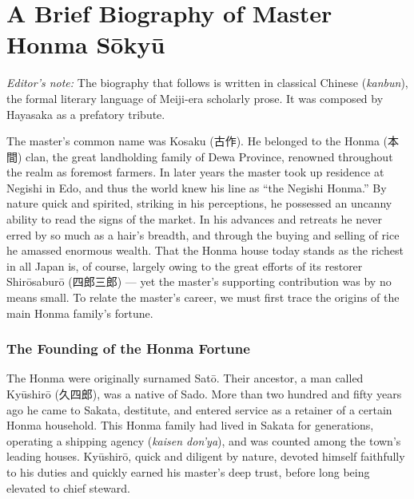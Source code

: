 \documentclass[10pt, openany]{book}
\newcommand{\jp}[1]{{\japanesefont #1}}
\newenvironment{editorialnote}{%
  \begin{editorbox}\small\textit{Editor's note:}\enspace}{\end{editorbox}}
\begin{document}
\chapter{A Brief Biography of Master Honma S\=oky\=u}

\begin{editorialnote}
The biography that follows is written in classical Chinese
(\textit{kanbun}), the formal literary language of Meiji-era scholarly
prose. It was composed by Hayasaka as a prefatory tribute.
\end{editorialnote}

The master's common name was Kosaku (\jp{古作}). He belonged to the
Honma (\jp{本間}) clan, the great landholding family of Dewa Province,
renowned throughout the realm as foremost farmers. In later years the
master took up residence at Negishi in Edo, and thus the world knew his
line as ``the Negishi Honma.'' By nature quick and spirited, striking in
his perceptions, he possessed an uncanny ability to read the signs of
the market. In his advances and retreats he never erred by so much as a
hair's breadth, and through the buying and selling of rice he amassed
enormous wealth. That the Honma house today stands as the richest in all
Japan is, of course, largely owing to the great efforts of its restorer
Shir\=osaburō (\jp{四郎三郎}) --- yet the master's supporting
contribution was by no means small. To relate the master's career, we
must first trace the origins of the main Honma family's fortune.

\subsection*{The Founding of the Honma Fortune}

The Honma were originally surnamed Sat\=o. Their ancestor, a man called
Ky\=ushir\=o (\jp{久四郎}), was a native of Sado. More than two hundred
and fifty years ago he came to Sakata, destitute, and entered service as
a retainer of a certain Honma household. This Honma family had lived in
Sakata for generations, operating a shipping agency
(\textit{kaisen don'ya}), and was counted among the town's leading
houses. Ky\=ushir\=o, quick and diligent by nature, devoted himself
faithfully to his duties and quickly earned his master's deep trust,
before long being elevated to chief steward.
\end{document}
